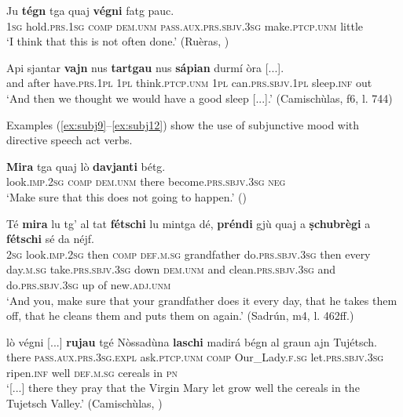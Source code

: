 \ea
\label{ex:subj6}
\gll  Ju \textbf{tégn} tga quaj \textbf{végni} fatg pauc.  \\
\textsc{1sg} hold.\textsc{prs.1sg} \textsc{comp} \textsc{dem.unm} \textsc{pass.aux.prs.sbjv.3sg} make.\textsc{ptcp.unm} little\\
\glt `I think that this is not often done.' (Ruèras, )
\z

\ea
\label{ex:subj8}
\gll    Api sjantar \textbf{vajn} nus \textbf{tartgau} {\longrule} nus \textbf{sápian} durmí òra [...].\\
and after have.\textsc{prs.1pl} \textsc{1pl} think.\textsc{ptcp.unm} {} \textsc{1pl}  can.\textsc{prs.sbjv.1pl} sleep.\textsc{inf} out\\
\glt `And then we thought we would have a good sleep [...].' (Camischùlas, f6, l. 744)
\z

Examples (\ref{ex:subj9}--\ref{ex:subj12}) show the use of subjunctive mood with directive speech act verbs.

\ea
\label{ex:subj9}
\gll  \textbf{Mira} tga quaj lò \textbf{davjanti} bétg. \\
look.\textsc{imp.2sg} \textsc{comp} \textsc{dem.unm} there become.\textsc{prs.sbjv.3sg} \textsc{neg}\\
\glt `Make sure that this does not going to happen.' ()
\z

\ea
\label{ex:subj10}
\gll  Té \textbf{mira} lu tg’ al tat \textbf{fétschi} lu mintga dé, \textbf{préndi} gjù quaj a \textbf{ṣchubrègi} a \textbf{fétschi} sé da néjf.\\
\textsc{2sg} look.\textsc{imp.2sg} then \textsc{comp} \textsc{def.m.sg} grandfather do.\textsc{prs.sbjv.3sg} then every day.\textsc{m.sg} take.\textsc{prs.sbjv.3sg} down \textsc{dem.unm} and clean.\textsc{prs.sbjv.3sg} and do.\textsc{prs.sbjv.3sg} up of new.\textsc{adj.unm} \\
\glt `And you, make sure that your grandfather does it every day, that he takes them off, that he cleans them and puts them on again.' (Sadrún, m4, l. 462ff.)
\z

\ea
\label{ex:subj11}
\gll [...] lò végni [...] \textbf{rujau} tgé Nòssadùna \textbf{laschi} madirá bégn al graun ajn Tujétsch.\\
{} there \textsc{pass.aux.prs.3sg.expl} {} ask.\textsc{ptcp.unm} \textsc{comp} Our\_Lady.\textsc{f.sg} let.\textsc{prs.sbjv.3sg} ripen.\textsc{inf} well \textsc{def.m.sg} cereals in \textsc{pn}\\
\glt `[...] there they pray that the Virgin Mary let grow well the cereals in the Tujetsch Valley.' (Camischùlas, \citealt[94]{Büchli1966})
\z


